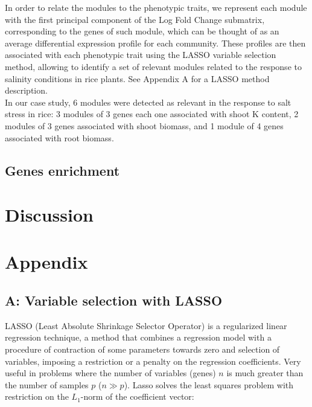 \documentclass[journal, onecolumn]{IEEEtran}
\begin{document}
In order to relate the modules to the phenotypic traits, we represent each module with the first principal component of the Log Fold Change submatrix, corresponding to the genes of such module, which can be thought of as an average differential expression profile for each community. These profiles are then associated with each phenotypic trait using the LASSO variable selection method, allowing to identify a set of relevant modules related to the response to salinity conditions in rice plants. See Appendix A for a LASSO method description.\\

In our case study, 6 modules were detected as relevant in the response to salt stress in rice: 3 modules of 3 genes each one associated with shoot K content, 2 modules of 3 genes associated with  shoot biomass, and 1 module of 4 genes associated with root biomass.\\

\subsection{Genes enrichment}

\section{Discussion}





\newpage
\section*{Appendix}
\subsection{A: Variable selection with LASSO}
LASSO (Least Absolute Shrinkage Selector Operator) is a regularized linear regression technique, a method that combines a regression model with a procedure of contraction of some parameters towards zero and selection of variables, imposing a restriction or a penalty on the regression coefficients. Very useful in problems where the number of variables (genes) $ n $ is much greater than the number of samples $ p $ ($ n \gg p $). Lasso solves the least squares problem with restriction on the $ L_1$-norm of the coefficient vector:
\end{document}
